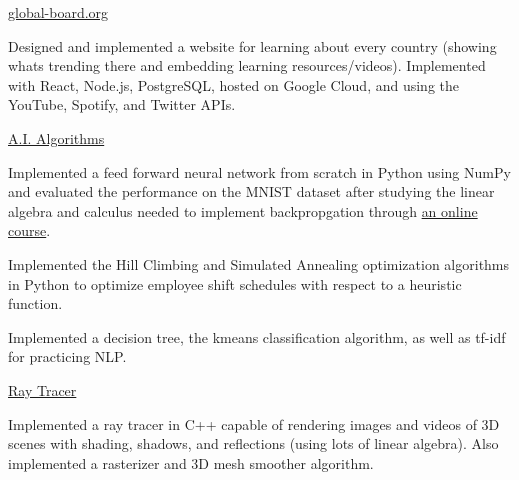 
\begin{cventries}
  \cventry
    {} %
    {\href{https://global-board.org}{global-board.org}} %
    {} %
    {} %
    {
      \begin{cvitems} %
      \item {Designed and implemented a website for learning about every country (showing whats trending there and embedding learning resources/videos).  Implemented with React, Node.js, PostgreSQL, hosted on Google Cloud, and using the YouTube, Spotify, and Twitter APIs.}
      \end{cvitems}
    }

  \cventry
    {} %
    {\href{https://github.com/dangbert/AI}{A.I. Algorithms}} %
    {} %
    {} %
    {
      \begin{cvitems} %
      \item {Implemented a feed forward neural network from scratch in Python using NumPy and evaluated the performance on the MNIST dataset after studying the linear algebra and calculus needed to implement backpropgation through \href{http://neuralnetworksanddeeplearning.com/}{an online course}.}
      \item {Implemented the Hill Climbing and Simulated Annealing optimization algorithms in Python 
to optimize employee shift schedules with respect to a heuristic function.}
      \item {Implemented a decision tree, the kmeans classification algorithm, as well as tf-idf for practicing NLP.}
      \end{cvitems}
    }

  \cventry
    {} %
    {\href{https://github.com/dangbert/raytracer/tree/master}{Ray Tracer}} %
    {} %
    {} %
    {
      \begin{cvitems} %
      \item {Implemented a ray tracer in C++ capable of rendering images and videos of 3D scenes with shading, shadows, and reflections (using lots of linear algebra).  Also implemented a rasterizer and 3D mesh smoother algorithm.}
      \end{cvitems}
    }
\end{cventries}
